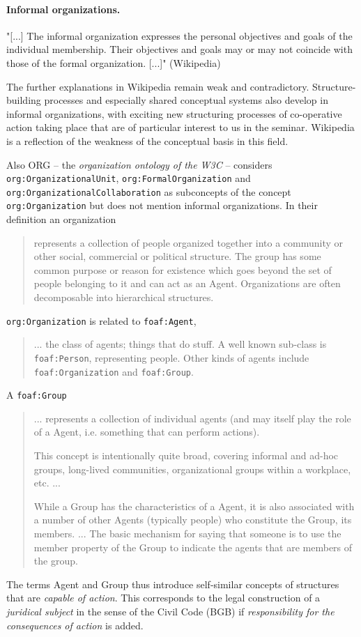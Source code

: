\documentclass[11pt,a4paper]{article}
\begin{document}
\paragraph{Informal organizations.}
"[...] The informal organization expresses the personal objectives and goals
of the individual membership. Their objectives and goals may or may not
coincide with those of the formal organization. [...]" (Wikipedia)

The further explanations in Wikipedia remain weak and contradictory.
Structure-building processes and especially shared conceptual systems also
develop in informal organizations, with exciting new structuring processes
of co-operative action taking place that are of particular interest to us in
the seminar. Wikipedia is a reflection of the weakness of the conceptual basis
in this field.

Also ORG -- the \emph{organization ontology of the W3C} \cite{vocab-org} --
considers \texttt{org:OrganizationalUnit}, \texttt{org:FormalOrganization} and
\texttt{org:OrganizationalCollaboration} as subconcepts of the concept
\texttt{org:Organization} but does not mention informal organizations.  In
their definition an organization
\begin{quote}
  represents a collection of people organized together into a community or
  other social, commercial or political structure. The group has some common
  purpose or reason for existence which goes beyond the set of people
  belonging to it and can act as an Agent. Organizations are often
  decomposable into hierarchical structures.~\cite{vocab-org}
\end{quote}

\texttt{org:Organization} is related to \texttt{foaf:Agent}, 
\begin{quote}\raggedright
  ... the class of agents; things that do stuff. A well known sub-class is
  \texttt{foaf:Person}, representing people. Other kinds of agents include
  \texttt{foaf:Organization} and \texttt{foaf:Group}. \cite{foaf}
\end{quote}

A \texttt{foaf:Group}
\begin{quote}
  ... represents a collection of individual agents (and may itself play the
  role of a Agent, i.e. something that can perform actions).

  This concept is intentionally quite broad, covering informal and ad-hoc
  groups, long-lived communities, organizational groups within a workplace,
  etc. ...
  
  While a Group has the characteristics of a Agent, it is also associated with
  a number of other Agents (typically people) who constitute the Group, its
  members. ...  The basic mechanism for saying that someone is to use the
  member property of the Group to indicate the agents that are members of the
  group.
\end{quote}
The terms Agent and Group thus introduce self-similar concepts of structures
that are \emph{capable of action}. This corresponds to the legal construction
of a \emph{juridical subject} in the sense of the Civil Code (BGB) if
\emph{responsibility for the consequences of action} is added.  
\end{document}
